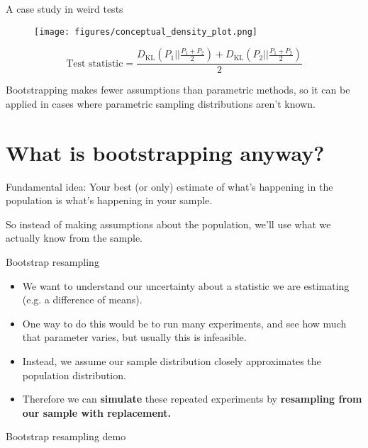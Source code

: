 \documentclass{beamer} %
\begin{document}
\begin{frame}{A case study in weird tests}
\begin{figure}
\centering
\texttt{[image: figures/conceptual\_density\_plot.png]}
\end{figure}
$$\text{Test statistic} = \frac{D_\text{KL}\left(P_1 || \frac{P_1 + P_2}{2}\right) + D_\text{KL}\left(P_2 || \frac{P_1 + P_2}{2}\right)}{2}$$
\end{frame}

\begin{frame}[standout]
Bootstrapping makes fewer assumptions than parametric methods, so it can be applied in cases where parametric sampling distributions aren't known. 
\end{frame}

\section{What is bootstrapping anyway?}

\begin{frame}[standout]
Fundamental idea: Your best (or only) estimate of what's happening in the population is what's happening in your sample. 
\end{frame}


\begin{frame}[standout]
So instead of making assumptions about the population, we'll use what we actually know from the sample.
\end{frame}

\begin{frame}{Bootstrap resampling}
\begin{itemize}[<+->] \itemsep 1em
\item We want to understand our uncertainty about a statistic we are estimating (e.g. a difference of means).
\item One way to do this would be to run many experiments, and see how much that parameter varies, but usually this is infeasible.
\item Instead, we assume our sample distribution closely approximates the population distribution.
\item Therefore we can \textbf{simulate} these repeated experiments by \textbf{resampling from our sample with replacement.}
\end{itemize}
\end{frame}

\begin{frame}{Bootstrap resampling demo}
\begin{figure}
\centering
{}
\end{figure}
\end{frame}
\end{document}
